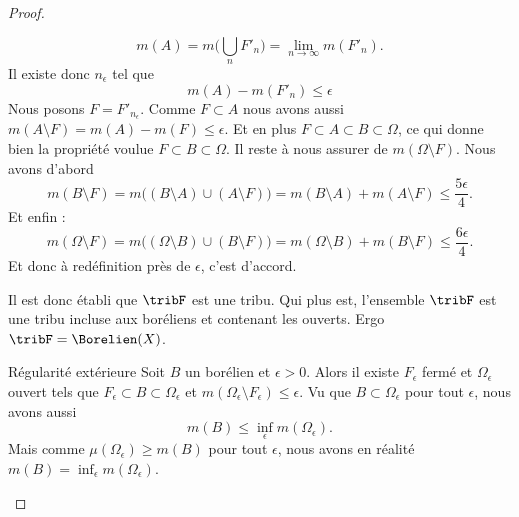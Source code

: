 \begin{proof}
\begin{subproof}
\begin{subproof}
                \begin{equation}
                    m(A)=m\big( \bigcup_nF'_n \big)=\lim_{n\to \infty} m(F'_n).
                \end{equation}
                Il existe donc \( n_{\epsilon}\) tel que
                \begin{equation}
                    m(A)-m(F'_{n})\leq \epsilon
                \end{equation}
                Nous posons \( F=F'_{n_{\epsilon}}\). Comme \( F\subset A\) nous avons aussi \( m(A\setminus F)=m(A)-m(F)\leq \epsilon\). Et en plus \( F\subset A\subset B\subset \Omega\), ce qui donne bien la propriété voulue \( F\subset B\subset \Omega\). Il reste à nous assurer de \( m(\Omega\setminus F)\). Nous avons d'abord
                \begin{equation}
                    m(B\setminus F)=m\big( (B\setminus A)\cup (A\setminus F) \big)=m(B\setminus A)+m(A\setminus F)\leq \frac{ 5\epsilon }{ 4 }.
                \end{equation}
                Et enfin :
                \begin{equation}
                    m(\Omega\setminus F)=m\big( (\Omega\setminus B)\cup (B\setminus F) \big)=m(\Omega\setminus B)+m(B\setminus F)\leq \frac{ 6\epsilon }{ 4 }.
                \end{equation}
                Et donc à redéfinition près de \( \epsilon\), c'est d'accord.
            \end{subproof}

            Il est donc établi que \( \tribF\) est une tribu. Qui plus est, l'ensemble \( \tribF\) est une tribu incluse aux boréliens et contenant les ouverts. Ergo \( \tribF=\Borelien(X)\).

        \item[Régularité extérieure]
            Soit \( B\) un borélien et \( \epsilon>0\). Alors il existe \( F_{\epsilon}\) fermé et \( \Omega_{\epsilon} \) ouvert tels que \( F_{\epsilon}\subset B\subset \Omega_{\epsilon}\) et \( m(\Omega_{\epsilon}\setminus F_{\epsilon})\leq \epsilon\). Vu que \( B\subset \Omega_{\epsilon}\) pour tout \( \epsilon\), nous avons aussi
            \begin{equation}
                m(B)\leq \inf_{\epsilon}m(\Omega_{\epsilon}).
            \end{equation}
            Mais comme \( \mu(\Omega_{\epsilon})\geq m(B)\) pour tout \( \epsilon\), nous avons en réalité \( m(B)=\inf_{\epsilon}m(\Omega_{\epsilon})\).


\end{subproof}
\end{proof}
